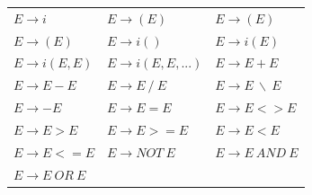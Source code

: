 \begin{table}[htbp]
\centering
\label{Redukční pravidla}
\begin{tabular}{lll}
    $E \to i$ &  $E \to (E)$ & $E \to (E)$ \\
    $E \to (E)$ & $E \to i()$ & $E \to i(E)$\\
    $E \to i(E, E)$ & $E \to i(E, E, ...)$ &  $E \to E + E$\\
    $E \to E - E$ & $E \to E ~ / ~ E$ & $E \to E ~ \backslash ~ E$\\
    $E \to - E$ &  $E \to E = E$ & $E \to E <> E$\\
    $E \to E > E$ & $E \to E >= E$ & $E \to E < E$\\
    $E \to E <= E$ & $E \to NOT ~ E$ & $E \to E ~ AND ~ E$\\
    $E \to E ~ OR ~ E$ & & \\
\end{tabular}
\end{table}


